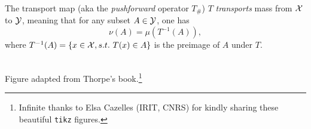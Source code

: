 \documentclass[pdf,aspectratio=169,10pt]{beamer}
\begin{document}
\begin{frame}{The transport map (aka the \emph{pushforward} operator $T_\#$)}
    $T$ \emph{transports} mass from ${\mathcal{X}}$ to ${\mathcal{Y}}$, meaning that for any subset $A\in{\mathcal{Y}}$, one has 
    \begin{equation}
        \nu(A) = \mu(T^{-1}(A)),
    \end{equation}
    where $T^{-1}(A)=\{x\in{\mathcal{X}}, s.t.\ T(x)\in A \}$ is the preimage of $A$ under $T$.


\\
{\small Figure adapted from Thorpe's book.\footnote{Infinite thanks to Elsa Cazelles (IRIT, CNRS) for kindly sharing these beautiful \texttt{tikz} figures.}}
\end{frame}
\end{document}
